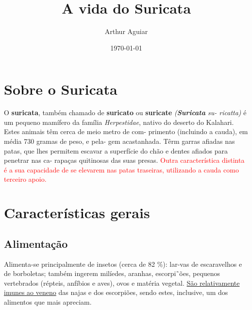 \documentclass[a4paper,12pt]{article}
\title{A vida do Suricata}
\author{Arthur Aguiar}
\date{\today}
\begin{document}
\maketitle

\section{Sobre o Suricata}
O \textbf{suricata}, também chamado de  \textbf{suricato} ou  \textbf{suricate} \textit{(\textbf{Suricata} su-
ricatta)} é um pequeno mamífero da família \textit{Herpestidae}, nativo do
deserto do Kalahari. Estes animais têm cerca de meio metro de com-
primento (incluindo a cauda), em média 730 gramas de peso, e pela-
gem acastanhada. Têrm garras afiadas nas patas, que lhes permitem
escavar a superfície do chão e dentes afiados para penetrar nas ca-
rapaças quitinosas das suas presas. \textcolor{red}{Outra característica distinta é a sua capacidade de se elevarem nas patas traseiras, utilizando a cauda como terceiro apoio.}

\section{Características gerais}
\subsection{Alimentação}
Alimenta-se principalmente de insetos (cerca de 82 \%): lar-vas de escaravelhos e de borboletas; também ingerem milíedes, aranhas, escorpi˜ões, pequenos vertebrados (répteis, anfíbios e aves), ovos
e matéria vegetal. \uline{São relativamente imunes ao veneno} das najas
e dos escorpiões, sendo estes, inclusive, um dos alimentos que mais
apreciam.
\end{document}
